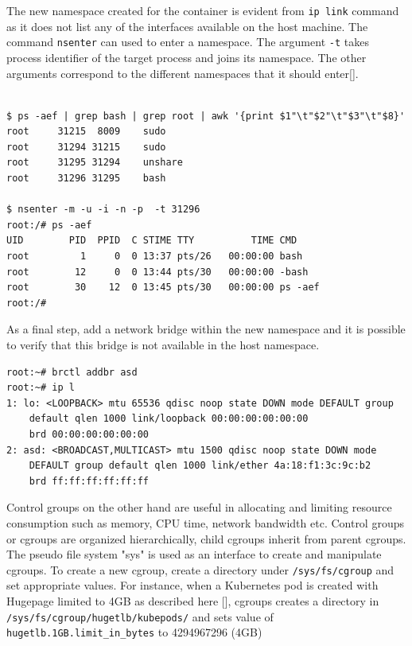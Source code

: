 \documentclass[english, 12pt, a4paper, elec, utf8, a-1b, online]{aaltothesis}
\begin{document}
The new namespace created for the container is evident from \lstinline{ip link} command as it does not list any of the interfaces available on the host machine. The command \lstinline{nsenter} can used to enter a namespace. The argument \lstinline{-t} takes process identifier of the target process and joins its namespace. The other arguments correspond to the different namespaces that it should enter[].

\begin{lstlisting}[basicstyle={\small\ttfamily}]

$ ps -aef | grep bash | grep root | awk '{print $1"\t"$2"\t"$3"\t"$8}'
root     31215  8009    sudo
root     31294 31215    sudo
root     31295 31294    unshare
root     31296 31295    bash

$ nsenter -m -u -i -n -p  -t 31296
root:/# ps -aef
UID        PID  PPID  C STIME TTY          TIME CMD
root         1     0  0 13:37 pts/26   00:00:00 bash
root        12     0  0 13:44 pts/30   00:00:00 -bash
root        30    12  0 13:45 pts/30   00:00:00 ps -aef
root:/# 

\end{lstlisting}

As a final step, add a network bridge within the new namespace and it is possible to verify that this bridge is not available in the host namespace.
\begin{lstlisting}[basicstyle={\small\ttfamily}]
root:~# brctl addbr asd
root:~# ip l
1: lo: <LOOPBACK> mtu 65536 qdisc noop state DOWN mode DEFAULT group
    default qlen 1000 link/loopback 00:00:00:00:00:00
    brd 00:00:00:00:00:00
2: asd: <BROADCAST,MULTICAST> mtu 1500 qdisc noop state DOWN mode
    DEFAULT group default qlen 1000 link/ether 4a:18:f1:3c:9c:b2
    brd ff:ff:ff:ff:ff:ff
\end{lstlisting}

Control groups on the other hand are useful in allocating and limiting resource consumption such as memory, CPU time, network bandwidth etc. Control groups or cgroups are organized hierarchically, child cgroups inherit from parent cgroups. The pseudo file system "sys" is used as an interface to create and manipulate cgroups. To create a new cgroup, create a directory under \lstinline{/sys/fs/cgroup} and set appropriate values. For instance, when a Kubernetes pod is created with Hugepage limited to 4GB as described here [], cgroups creates a directory in \lstinline{/sys/fs/cgroup/hugetlb/kubepods/} and sets value of \lstinline{hugetlb.1GB.limit_in_bytes} to 4294967296 (4GB)
\end{document}
